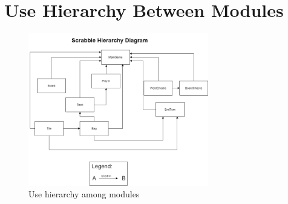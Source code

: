 \documentclass[12pt, titlepage]{article}
\begin{document}
\section{Use Hierarchy Between Modules} \label{Module Hierarchy} %

\begin{figure}[H]
\centering
\includegraphics[width=0.7\textwidth]{mg_section7.png}
\caption{Use hierarchy among modules}
\label{FigUH}
\end{figure}


\end{document}
